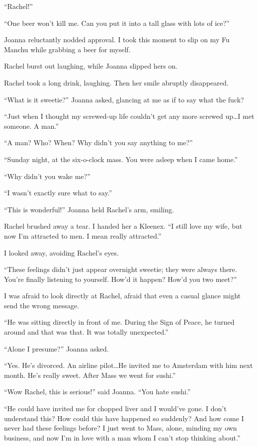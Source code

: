 ``Rachel!''

``One beer won't kill me. Can you put it into a tall glass with lots of
ice?''

Joanna reluctantly nodded approval. I took this moment to slip on my Fu
Manchu while grabbing a beer for myself.

Rachel burst out laughing, while Joanna slipped hers on.

Rachel took a long drink, laughing. Then her smile abruptly disappeared.

``What is it sweetie?'' Joanna asked, glancing at me as if to say what
the fuck?

``Just when I thought my screwed-up life couldn't get any more screwed
up\ldots I met someone. A man.''

``A man? Who? When? Why didn't you say anything to me?''

``Sunday night, at the six-o-clock mass. You were asleep when I came
home.''

``Why didn't you wake me?''

``I wasn't exactly sure what to say.''

``This is wonderful!'' Joanna held Rachel's arm, smiling.

Rachel brushed away a tear. I handed her a Kleenex. ``I still love my
wife, but now I'm attracted to men. I mean really attracted.''

I looked away, avoiding Rachel's eyes.

``These feelings didn't just appear overnight sweetie; they were always
there. You're finally listening to yourself. How'd it happen? How'd you
two meet?''

I was afraid to look directly at Rachel, afraid that even a casual
glance might send the wrong message.

``He was sitting directly in front of me. During the Sign of Peace, he
turned around and that was that. It was totally unexpected.''

``Alone I presume?'' Joanna asked.

``Yes. He's divorced. An airline pilot\ldots He invited me to Amsterdam
with him next month. He's really sweet. After Mass we went for sushi.''

``Wow Rachel, this is serious!'' said Joanna. ``You hate sushi.''

``He could have invited me for chopped liver and I would've gone. I
don't understand this? How could this have happened so suddenly? And how
come I never had these feelings before? I just went to Mass, alone,
minding my own business, and now I'm in love with a man whom I can't
stop thinking about.''

